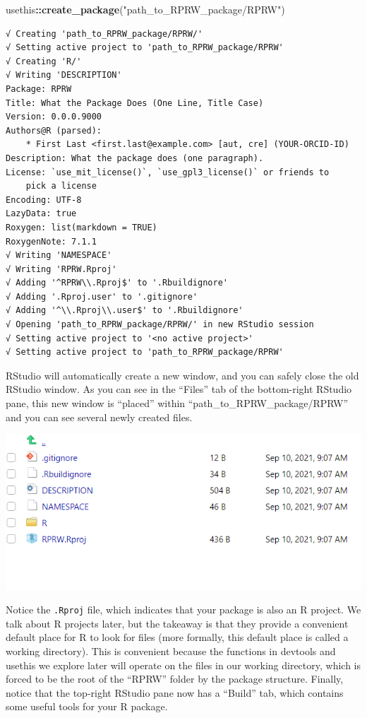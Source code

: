 \documentclass[
]{book}
\newenvironment{Shaded}{\begin{snugshade}}{\end{snugshade}}
\newcommand{\KeywordTok}[1]{\textcolor[rgb]{0.13,0.29,0.53}{\textbf{#1}}}
\newcommand{\NormalTok}[1]{#1}
\newcommand{\OperatorTok}[1]{\textcolor[rgb]{0.81,0.36,0.00}{\textbf{#1}}}
\newcommand{\StringTok}[1]{\textcolor[rgb]{0.31,0.60,0.02}{#1}}
\begin{document}
\begin{Shaded}
\begin{Highlighting}[]
\NormalTok{usethis}\OperatorTok{::}\KeywordTok{create_package}\NormalTok{(}\StringTok{"path_to_RPRW_package/RPRW"}\NormalTok{)}
\end{Highlighting}
\end{Shaded}

\begin{verbatim}
√ Creating 'path_to_RPRW_package/RPRW/'
√ Setting active project to 'path_to_RPRW_package/RPRW'
√ Creating 'R/'
√ Writing 'DESCRIPTION'
Package: RPRW
Title: What the Package Does (One Line, Title Case)
Version: 0.0.0.9000
Authors@R (parsed):
    * First Last <first.last@example.com> [aut, cre] (YOUR-ORCID-ID)
Description: What the package does (one paragraph).
License: `use_mit_license()`, `use_gpl3_license()` or friends to
    pick a license
Encoding: UTF-8
LazyData: true
Roxygen: list(markdown = TRUE)
RoxygenNote: 7.1.1
√ Writing 'NAMESPACE'
√ Writing 'RPRW.Rproj'
√ Adding '^RPRW\\.Rproj$' to '.Rbuildignore'
√ Adding '.Rproj.user' to '.gitignore'
√ Adding '^\\.Rproj\\.user$' to '.Rbuildignore'
√ Opening 'path_to_RPRW_package/RPRW/' in new RStudio session
√ Setting active project to '<no active project>'
√ Setting active project to 'path_to_RPRW_package/RPRW'
\end{verbatim}

RStudio will automatically create a new window, and you can safely close the old RStudio window. As you can see in the ``Files'' tab of the bottom-right RStudio pane, this new window is ``placed'' within ``path\_to\_RPRW\_package/RPRW'' and you can see several newly created files.

\includegraphics[width=1\linewidth]{images/newrpack_files}

Notice the \texttt{.Rproj} file, which indicates that your package is also an R project. We talk about R projects later, but the takeaway is that they provide a convenient default place for R to look for files (more formally, this default place is called a working directory). This is convenient because the functions in devtools and usethis we explore later will operate on the files in our working directory, which is forced to be the root of the ``RPRW'' folder by the package structure. Finally, notice that the top-right RStudio pane now has a ``Build'' tab, which contains some useful tools for your R package.
\end{document}
